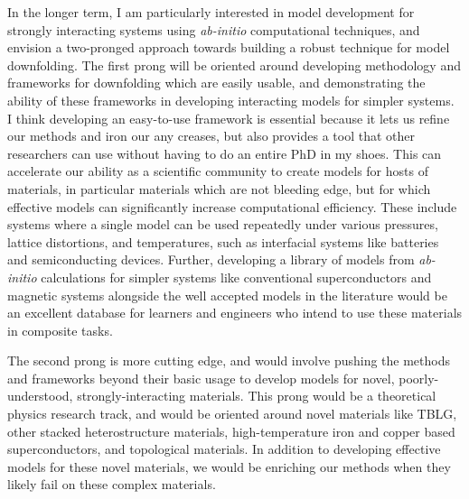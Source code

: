 \documentclass{article}
\begin{document}
In the longer term, I am particularly interested in model development for strongly interacting systems using \textit{ab-initio} computational techniques, and envision a two-pronged approach towards building a robust technique for model downfolding. 
The first prong will be oriented around developing methodology and frameworks for downfolding which are easily usable, and demonstrating the ability of these frameworks in developing interacting models for simpler systems.
I think developing an easy-to-use framework is essential because it lets us refine our methods and iron our any creases, but also provides a tool that other researchers can use without having to do an entire PhD in my shoes.
This can accelerate our ability as a scientific community to create models for hosts of materials, in particular materials which are not bleeding edge, but for which effective models can significantly increase computational efficiency.
These include systems where a single model can be used repeatedly under various pressures, lattice distortions, and temperatures, such as interfacial systems like batteries and semiconducting devices.
Further, developing a library of models from \textit{ab-initio} calculations for simpler systems like conventional superconductors and magnetic systems alongside the well accepted models in the literature would be an excellent database for learners and engineers who intend to use these materials in composite tasks.

The second prong is more cutting edge, and would involve pushing the methods and frameworks beyond their basic usage to develop models for novel, poorly-understood, strongly-interacting materials.
This prong would be a theoretical physics research track, and would be oriented around novel materials like TBLG, other stacked heterostructure materials,  high-temperature iron and copper based superconductors, and topological materials.
In addition to developing effective models for these novel materials, we would be enriching our methods when they likely fail on these complex materials.
\end{document}

